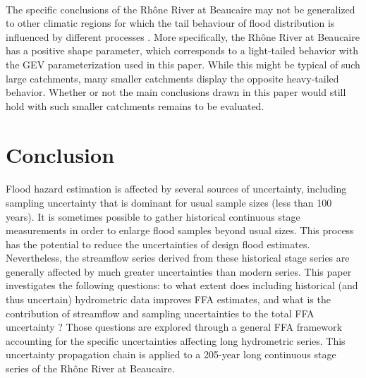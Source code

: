 \documentclass[11pt]{article}
\begin{document}
    \paragraph{}
    The specific conclusions of the Rhône River at Beaucaire may not be generalized to other climatic regions for which the tail behaviour of flood distribution is influenced by different processes \citep{merz_understanding_2022}. More specifically, the Rhône River at Beaucaire has a positive shape parameter, which corresponds to a light-tailed behavior with the GEV parameterization used in this paper. While this might be typical of such large catchments, many smaller catchments display the opposite heavy-tailed behavior. Whether or not the main conclusions drawn in this paper would still hold with such smaller catchments remains to be evaluated.
    \paragraph{}
    

 

\section{Conclusion}
\label{sec:Conclusion}

    \paragraph{} Flood hazard estimation is affected by several sources of uncertainty, including sampling uncertainty that is dominant for usual sample sizes (less than 100 years). It is sometimes possible to gather historical continuous stage measurements in order to enlarge flood samples beyond usual sizes. This process has the potential to reduce the uncertainties of design flood estimates. Nevertheless, the streamflow series derived from these historical stage series are generally affected by much greater uncertainties than modern series. This paper investigates the following questions: to what extent does including historical (and thus uncertain) hydrometric data improves FFA estimates, and what is the contribution of streamflow and sampling uncertainties to the total FFA uncertainty ? Those questions are explored through a general FFA framework accounting for the specific uncertainties affecting long hydrometric series. This uncertainty propagation chain is applied to a 205-year long continuous stage series of the Rhône River at Beaucaire.
\end{document}
